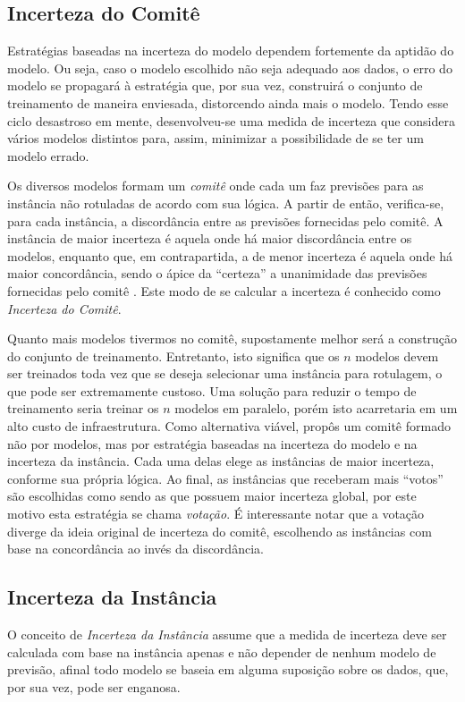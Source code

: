 \subsection{Incerteza do Comitê}
Estratégias baseadas na incerteza do modelo dependem fortemente da aptidão do modelo. Ou seja, caso o modelo escolhido não seja adequado aos dados, o erro do modelo se propagará à estratégia que, por sua vez, construirá o conjunto de treinamento de maneira enviesada, distorcendo ainda mais o modelo. Tendo esse ciclo desastroso em mente, desenvolveu-se uma medida de incerteza que considera vários modelos distintos para, assim, minimizar a possibilidade de se ter um modelo errado. 

Os diversos modelos formam um \textit{comitê} onde cada um faz previsões para as instância não rotuladas de acordo com sua lógica. A partir de então, verifica-se, para cada instância, a discordância entre as previsões fornecidas pelo comitê. A instância de maior incerteza é aquela onde há maior discordância entre os modelos, enquanto que, em contrapartida, a de menor incerteza é aquela onde há maior concordância, sendo o ápice da ``certeza'' a unanimidade das previsões fornecidas pelo comitê \citep{Seung:1992:QC:130385.130417}. Este modo de se calcular a incerteza é conhecido como \textit{Incerteza do Comitê}.

Quanto mais modelos tivermos no comitê, supostamente melhor será a construção do conjunto de treinamento. Entretanto, isto significa que os $n$ modelos devem ser treinados toda vez que se deseja selecionar uma instância para rotulagem, o que pode ser extremamente custoso. Uma solução para reduzir o tempo de treinamento seria treinar os $n$ modelos em paralelo, porém isto acarretaria em um alto custo de infraestrutura. Como alternativa viável, \citep{Elahi:2014:ALS:2542182.2542195} propôs um comitê formado não por modelos, mas por estratégia baseadas na incerteza do modelo e na incerteza da instância. Cada uma delas elege as instâncias de maior incerteza, conforme sua própria lógica. Ao final, as instâncias que receberam mais ``votos'' são escolhidas como sendo as que possuem maior incerteza global, por este motivo esta estratégia se chama \textit{votação}. É interessante notar que a votação diverge da ideia original de incerteza do comitê, escolhendo as instâncias com base na concordância ao invés da discordância.

\subsection{Incerteza da Instância}
O conceito de \textit{Incerteza da Instância} assume que a medida de incerteza deve ser calculada com base na instância apenas e não depender de nenhum modelo de previsão, afinal todo modelo se baseia em alguma suposição sobre os dados, que, por sua vez, pode ser enganosa. 

